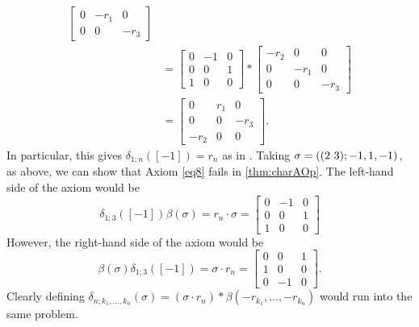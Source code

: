 \begin{example}
\begin{enumerate}
\begin{align*}
\begin{bmatrix}
      0 & -r_1 & 0 \\
      0 & 0 & -r_3
      \end{bmatrix}\\
&=
    \begin{bmatrix}
      0 & -1 & 0 \\
      0 & 0 & 1 \\
      1 & 0 & 0
      \end{bmatrix}
      \ast
      \begin{bmatrix}
      -r_2 & 0 & 0 \\
      0 & -r_1 & 0 \\
      0 & 0 & -r_3
      \end{bmatrix}\\
      &= \begin{bmatrix}
      0 & r_1 & 0\\
      0 & 0 & -r_3 \\
      -r_2 & 0 & 0
      \end{bmatrix}.
    \end{align*}
In particular, this gives $\delta_{1;n}([-1]) = r_n$ as in \cite{zhang-grp}. Taking $\sigma = (( 2 \, \, 3 );-1,1,-1)$, as above, we can show that Axiom \ref{eq8} fails in \cref{thm:charAOp}. The left-hand side of the axiom would be
        \[
          \delta_{1;3}([-1])\beta(\sigma) = r_n \cdot \sigma =
          \begin{bmatrix}
          0 & -1 & 0 \\
          0 & 0 & 1 \\
          1 & 0 & 0
          \end{bmatrix}
        \]
However, the right-hand side of the axiom would be
  \[
    \beta(\sigma)\delta_{1;3}([-1]) = \sigma \cdot r_n =
    \begin{bmatrix}
    0 & 0 & 1 \\
    1 & 0 & 0 \\
    0 & -1 & 0
    \end{bmatrix}.
  \]
Clearly defining $\delta_{n;k_1,\ldots,k_n}(\sigma) = (\sigma \cdot r_n) \ast \beta(-r_{k_1},\ldots,-r_{k_n})$ would run into the same problem.


\end{enumerate}
\end{example}
